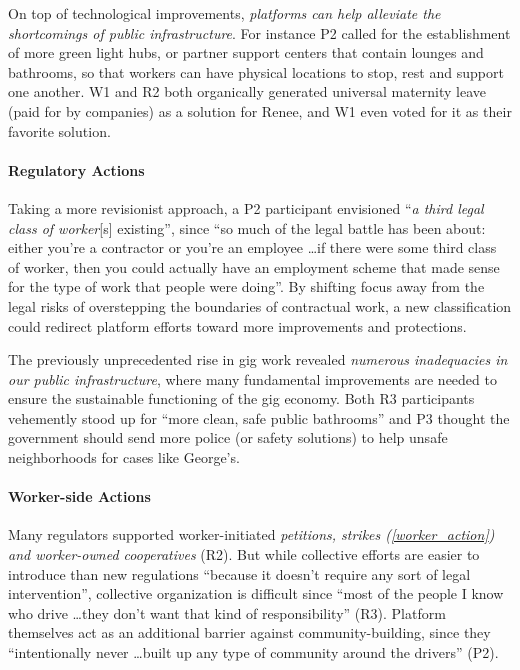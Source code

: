 On top of technological improvements, \textit{platforms can help alleviate the shortcomings of public infrastructure}. For instance P2 called for the establishment of more green light hubs, or partner support centers that contain lounges and bathrooms, so that workers can have physical locations to stop, rest and support one another. W1 and R2 both organically generated universal maternity leave (paid for by companies) as a solution for Renee, and W1 even voted for it as their favorite solution. 

\paragraph{Regulatory Actions} \label{revisions}
Taking a more revisionist approach, a P2 participant envisioned ``\textit{a third legal class of worker}[s] existing'', since ``so much of the legal battle has been about: either you're a contractor or you're an employee \dots if there were some third class of worker, then you could actually have an employment scheme that made sense for the type of work that people were doing''. By shifting focus away from the legal risks of overstepping the boundaries of contractual work, a new classification could redirect platform efforts toward more improvements and protections.

The previously unprecedented rise in gig work revealed \textit{numerous inadequacies in our public infrastructure}, where many fundamental improvements are needed to ensure the sustainable functioning of the gig economy. Both R3 participants vehemently stood up for ``more clean, safe public bathrooms'' and P3 thought the government should send more police (or safety solutions) to help unsafe neighborhoods for cases like George's.


\paragraph{Worker-side Actions}
Many regulators supported worker-initiated \textit{petitions, strikes (\ref{worker_action}) and  worker-owned cooperatives} (R2). But while collective efforts are easier to introduce than new regulations ``because it doesn't require any sort of legal intervention'', collective organization is difficult since ``most of the people I know who drive \dots they don't want that kind of responsibility'' (R3). Platform themselves act as an additional barrier against community-building, since they ``intentionally never \dots built up any type of community around the drivers'' (P2). 

